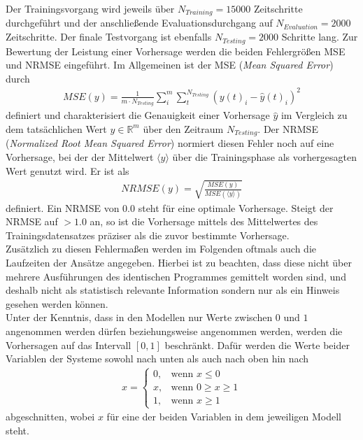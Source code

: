Der Trainingsvorgang wird jeweils über $N_{Training}=15000$ Zeitschritte durchgeführt und der anschließende Evaluationsdurchgang auf $N_{Evaluation} = 2000$ Zeitschritte. Der finale Testvorgang ist ebenfalls $N_{Testing}=2000$ Schritte lang.
Zur Bewertung der Leistung einer Vorhersage werden die beiden Fehlergrößen MSE und NRMSE eingeführt. Im Allgemeinen ist der MSE (\textit{Mean Squared Error}) durch
\begin{align}
MSE(y) = \frac{1}{m \cdot N_{Testing}} \sum_i^m \sum_t^{N_{Testing}} \left(y(t)_i - \hat{y}(t)_i \right)^2
\end{align}
definiert und charakterisiert die Genauigkeit einer Vorhersage $\hat{y}$ im Vergleich zu dem tatsächlichen Wert $y \in \mathbb{R}^m$ über den Zeitraum $N_{Testing}$. Der NRMSE (\textit{Normalized Root Mean Squared Error}) normiert diesen Fehler noch auf eine Vorhersage, bei der der Mittelwert $\langle y \rangle$ über die Trainingsphase als vorhergesagten Wert genutzt wird. Er ist als
\begin{align}
NRMSE(y) = \sqrt{\frac{MSE(y)}{MSE\left(\langle y \rangle\right)}}
\end{align}
definiert. Ein NRMSE von $0.0$ steht für eine optimale Vorhersage. Steigt der NRMSE auf $>1.0$ an, so ist die Vorhersage mittels des Mittelwertes des Trainingsdatensatzes präziser als die zuvor bestimmte Vorhersage.\\
Zusätzlich zu diesen Fehlermaßen werden im Folgenden oftmals auch die Laufzeiten der Ansätze angegeben. Hierbei ist zu beachten, dass diese nicht über mehrere Ausführungen des identischen Programmes gemittelt worden sind, und deshalb nicht als statistisch relevante Information sondern nur als ein Hinweis gesehen werden können.\\

Unter der Kenntnis, dass in den Modellen nur Werte zwischen $0$ und $1$ angenommen werden dürfen beziehungsweise angenommen werden, werden die Vorhersagen auf das Intervall $[0, 1]$ beschränkt. Dafür werden die Werte beider Variablen der Systeme sowohl nach unten als auch nach oben hin nach 
\begin{align}
x = \begin{cases}
	0,& \text{wenn } x \leq 0\\
	x,& \text{wenn } 0 \geq x \geq1\\
    1,& \text{wenn } x \geq 1
\end{cases}
\end{align}
abgeschnitten, wobei $x$ für eine der beiden Variablen in dem jeweiligen Modell steht.\\

